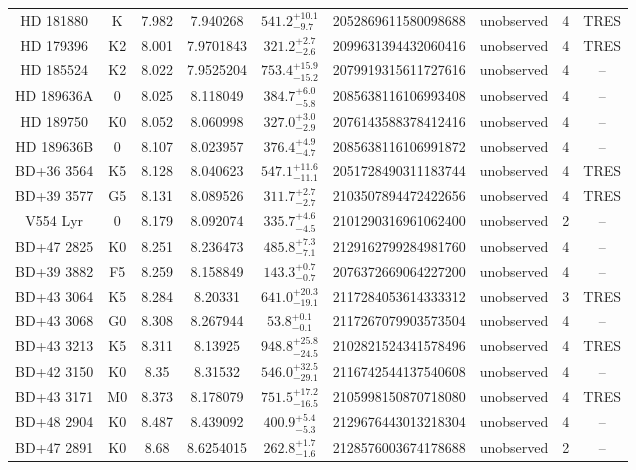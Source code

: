 \begin{table*}
\begin{tabular}{ccccccccc}
HD 181880 & K & 7.982 & 7.940268 & $541.2^{+10.1}_{-9.7}$ & 2052869611580098688 & unobserved & 4 & TRES \\
HD 179396 & K2 & 8.001 & 7.9701843 & $321.2^{+2.7}_{-2.6}$ & 2099631394432060416 & unobserved & 4 & TRES \\
HD 185524 & K2 & 8.022 & 7.9525204 & $753.4^{+15.9}_{-15.2}$ & 2079919315611727616 & unobserved & 4 & -- \\
HD 189636A & 0 & 8.025 & 8.118049 & $384.7^{+6.0}_{-5.8}$ & 2085638116106993408 & unobserved & 4 & -- \\
HD 189750 & K0 & 8.052 & 8.060998 & $327.0^{+3.0}_{-2.9}$ & 2076143588378412416 & unobserved & 4 & -- \\
HD 189636B & 0 & 8.107 & 8.023957 & $376.4^{+4.9}_{-4.7}$ & 2085638116106991872 & unobserved & 4 & -- \\
BD+36 3564 & K5 & 8.128 & 8.040623 & $547.1^{+11.6}_{-11.1}$ & 2051728490311183744 & unobserved & 4 & TRES \\
BD+39 3577 & G5 & 8.131 & 8.089526 & $311.7^{+2.7}_{-2.7}$ & 2103507894472422656 & unobserved & 4 & TRES \\
V554 Lyr & 0 & 8.179 & 8.092074 & $335.7^{+4.6}_{-4.5}$ & 2101290316961062400 & unobserved & 2 & -- \\
BD+47 2825 & K0 & 8.251 & 8.236473 & $485.8^{+7.3}_{-7.1}$ & 2129162799284981760 & unobserved & 4 & -- \\
BD+39 3882 & F5 & 8.259 & 8.158849 & $143.3^{+0.7}_{-0.7}$ & 2076372669064227200 & unobserved & 4 & -- \\
BD+43 3064 & K5 & 8.284 & 8.20331 & $641.0^{+20.3}_{-19.1}$ & 2117284053614333312 & unobserved & 3 & TRES \\
BD+43 3068 & G0 & 8.308 & 8.267944 & $53.8^{+0.1}_{-0.1}$ & 2117267079903573504 & unobserved & 4 & -- \\
BD+43 3213 & K5 & 8.311 & 8.13925 & $948.8^{+25.8}_{-24.5}$ & 2102821524341578496 & unobserved & 4 & TRES \\
BD+42 3150 & K0 & 8.35 & 8.31532 & $546.0^{+32.5}_{-29.1}$ & 2116742544137540608 & unobserved & 4 & -- \\
BD+43 3171 & M0 & 8.373 & 8.178079 & $751.5^{+17.2}_{-16.5}$ & 2105998150870718080 & unobserved & 4 & TRES \\
BD+48 2904 & K0 & 8.487 & 8.439092 & $400.9^{+5.4}_{-5.3}$ & 2129676443013218304 & unobserved & 4 & -- \\
BD+47 2891 & K0 & 8.68 & 8.6254015 & $262.8^{+1.7}_{-1.6}$ & 2128576003674178688 & unobserved & 2 & -- \\
\hline
\end{tabular}
\end{table*}
